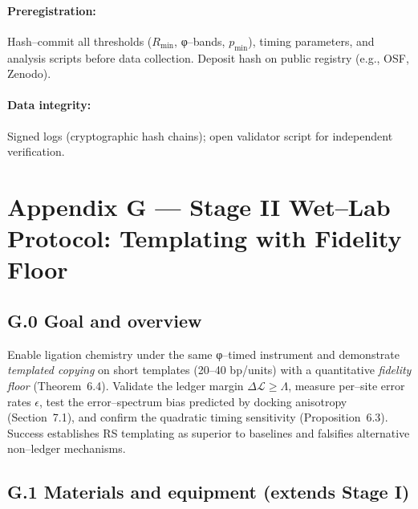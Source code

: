 \documentclass[11pt]{article}
\begin{document}
\paragraph{Preregistration:}
Hash–commit all thresholds ($R_{\min}$, φ–bands, $p_{\min}$), timing parameters, and analysis scripts before data collection. Deposit hash on public registry (e.g., OSF, Zenodo).

\paragraph{Data integrity:}
Signed logs (cryptographic hash chains); open validator script for independent verification.


\section*{Appendix G — Stage II Wet–Lab Protocol: Templating with Fidelity Floor}\label{app:stage2-protocol}

\subsection*{G.0 Goal and overview}
Enable ligation chemistry under the same φ–timed instrument and demonstrate \emph{templated copying} on short templates (20–40 bp/units) with a quantitative \emph{fidelity floor} (Theorem~6.4). Validate the ledger margin $\Delta\mathcal{L}\ge\Lambda$, measure per–site error rates $\epsilon$, test the error–spectrum bias predicted by docking anisotropy (Section~7.1), and confirm the quadratic timing sensitivity (Proposition~6.3). Success establishes RS templating as superior to baselines and falsifies alternative non–ledger mechanisms.

\subsection*{G.1 Materials and equipment (extends Stage I)}
\end{document}
